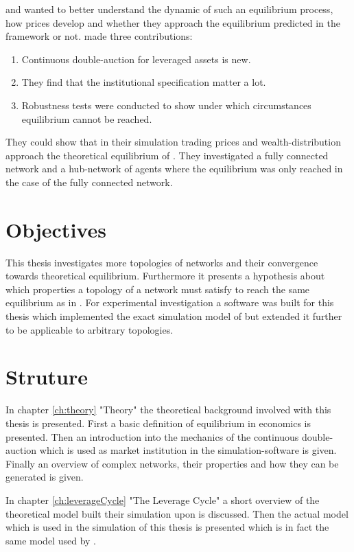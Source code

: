 \documentclass[Bachelorarbeit.tex]{subfiles}
\begin{document}
and wanted to better understand the dynamic of such an equilibrium process, how prices develop and whether they approach the equilibrium predicted in the framework or not. \cite{Breuer2015} made three contributions:

\begin{enumerate}
\item Continuous double-auction for leveraged assets is new.
\item They find that the institutional specification matter a lot.
\item Robustness tests were conducted to show under which circumstances equilibrium cannot be reached.
\end{enumerate}

They could show that in their simulation trading prices and wealth-distribution approach the theoretical equilibrium of \cite{Geanakoplos2009}. They investigated a fully connected network and a hub-network of agents where the equilibrium was only reached in the case of the fully connected network. 

\section{Objectives}
This thesis investigates more topologies of networks and their convergence towards theoretical equilibrium. Furthermore it presents a hypothesis about which properties a topology of a network must satisfy to reach the same equilibrium as in \cite{Breuer2015}. For experimental investigation a software was built for this thesis which implemented the exact simulation model of \cite{Breuer2015} but extended it further to be applicable to arbitrary topologies.

\section{Struture}
In chapter \ref{ch:theory} "Theory" the theoretical background involved with this thesis is presented. First a basic definition of equilibrium in economics is presented. Then an introduction into the mechanics of the continuous double-auction which is used as market institution in the simulation-software is given. Finally an overview of complex networks, their properties and how they can be generated is given.

\bigskip

In chapter \ref{ch:leverageCycle} "The Leverage Cycle" a short overview of the theoretical model \cite{Breuer2015} built their simulation upon is discussed. Then the actual model which is used in the simulation of this thesis is presented which is in fact the same model used by \cite{Breuer2015}.
\end{document}
